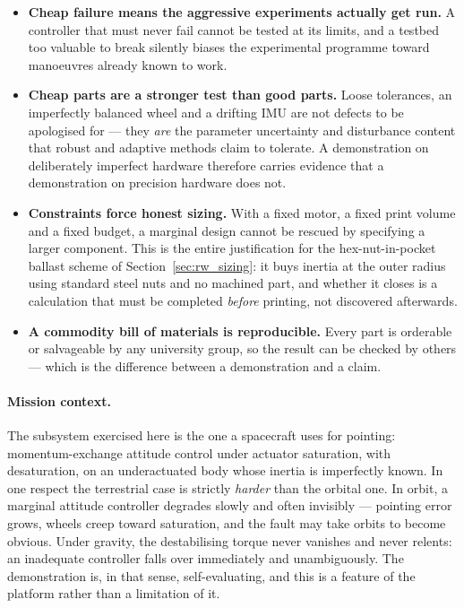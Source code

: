 \begin{itemize}
    \item \textbf{Cheap failure means the aggressive experiments actually get run.} A controller that must never fail cannot be tested at its limits, and a testbed too valuable to break silently biases the experimental programme toward manoeuvres already known to work.
    \item \textbf{Cheap parts are a stronger test than good parts.} Loose tolerances, an imperfectly balanced wheel and a drifting IMU are not defects to be apologised for --- they \emph{are} the parameter uncertainty and disturbance content that robust and adaptive methods claim to tolerate. A demonstration on deliberately imperfect hardware therefore carries evidence that a demonstration on precision hardware does not.
    \item \textbf{Constraints force honest sizing.} With a fixed motor, a fixed print volume and a fixed budget, a marginal design cannot be rescued by specifying a larger component. This is the entire justification for the hex-nut-in-pocket ballast scheme of Section~\ref{sec:rw_sizing}: it buys inertia at the outer radius using standard steel nuts and no machined part, and whether it closes is a calculation that must be completed \emph{before} printing, not discovered afterwards.
    \item \textbf{A commodity bill of materials is reproducible.} Every part is orderable or salvageable by any university group, so the result can be checked by others --- which is the difference between a demonstration and a claim.
\end{itemize}

\paragraph{Mission context.} The subsystem exercised here is the one a spacecraft uses for pointing: momentum-exchange attitude control under actuator saturation, with desaturation, on an underactuated body whose inertia is imperfectly known. In one respect the terrestrial case is strictly \emph{harder} than the orbital one. In orbit, a marginal attitude controller degrades slowly and often invisibly --- pointing error grows, wheels creep toward saturation, and the fault may take orbits to become obvious. Under gravity, the destabilising torque never vanishes and never relents: an inadequate controller falls over immediately and unambiguously. The demonstration is, in that sense, self-evaluating, and this is a feature of the platform rather than a limitation of it.

